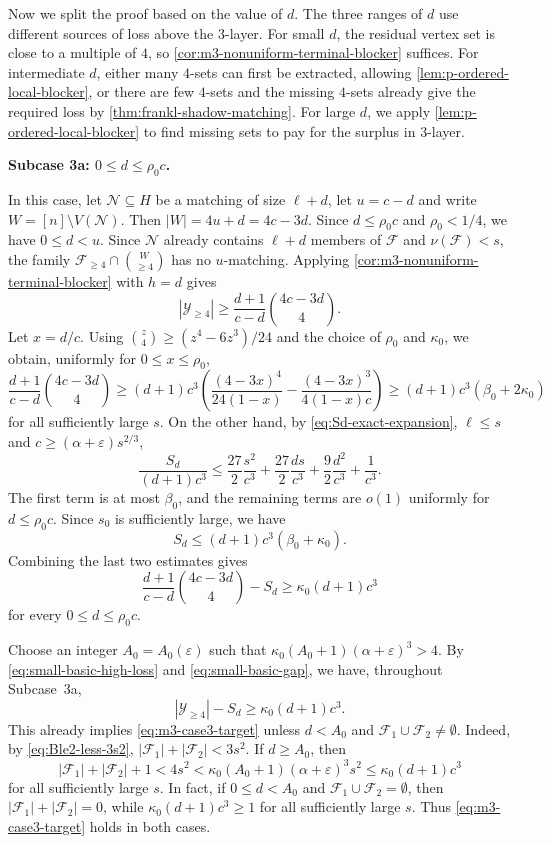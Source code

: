 \documentclass[10pt,a4paper]{article}
\numberwithin{equation}{section}
\theoremstyle{definition}
\newcommand{\F}{\mathcal F}
\newcommand{\Y}{\mathcal Y}
\begin{document}
Now we split the proof based on the value of $d$.
The three ranges of $d$ use different sources of loss above the $3$-layer.
For small $d$, the residual vertex set is close to a multiple of $4$, so \cref{cor:m3-nonuniform-terminal-blocker} suffices.
For intermediate $d$, either many $4$-sets can first be extracted,
allowing \cref{lem:p-ordered-local-blocker}, or there are few $4$-sets and the missing $4$-sets already give the required loss by \cref{thm:frankl-shadow-matching}.
For large $d$, we apply \cref{lem:p-ordered-local-blocker} to find missing sets to pay for the surplus in $3$-layer.

\medskip
\noindent\textbf{Subcase 3a: $0\le d\le\rho_0 c$.}
\medskip

In this case, let $\mathcal N\subseteq H$ be a matching of size $\ell+d$, let $u=c-d$ and write $W=[n]\setminus V(\mathcal N)$.
Then $|W|=4u+d=4c-3d$.
Since $d\le \rho_0 c$ and $\rho_0<1/4$, we have $0\le d<u$.
Since $\mathcal N$ already contains $\ell+d$ members of $\F$ and $\nu(\mathcal F)<s$, the family $\F_{\ge4}\cap\binom W{\ge4}$ has no $u$-matching.
Applying \cref{cor:m3-nonuniform-terminal-blocker} with $h=d$ gives
\begin{equation}\label{eq:small-basic-high-loss}
        |\Y_{\ge4}|
        \ge
        \frac{d+1}{c-d}\binom{4c-3d}{4}.
\end{equation}
Let $x=d/c$.
Using $\binom z4\ge (z^4-6z^3)/24$ and the choice of $\rho_0$ and $\kappa_0$, we obtain, uniformly for $0\le x\le\rho_0$,
\[
        \frac{d+1}{c-d}\binom{4c-3d}{4}
        \ge
        (d+1)c^3
        \left(
        \frac{(4-3x)^4}{24(1-x)}
        -\frac{(4-3x)^3}{4(1-x)c}
        \right)
        \ge (d+1)c^3(\beta_0+2\kappa_0)
\]
for all sufficiently large $s$.
On the other hand, by \eqref{eq:Sd-exact-expansion}, $\ell\le s$ and $c\ge(\alpha+\varepsilon)s^{2/3}$,
\[
        \frac{S_d}{(d+1)c^3}
        \le
        \frac{27}{2}\frac{s^2}{c^3}
        +\frac{27}{2}\frac{ds}{c^3}
        +\frac{9}{2}\frac{d^2}{c^3}
        +\frac1{c^3}.
\]
The first term is at most $\beta_0$, and the remaining terms are $o(1)$ uniformly for $d\le\rho_0 c$.
Since $s_0$ is sufficiently large, we have
\[
        S_d\le (d+1)c^3(\beta_0+\kappa_0).
\]
Combining the last two estimates gives
\begin{equation}\label{eq:small-basic-gap}
        \frac{d+1}{c-d}\binom{4c-3d}{4}-S_d
        \ge
        \kappa_0(d+1)c^3
\end{equation}
for every $0\le d\le\rho_0 c$.

Choose an integer $A_0=A_0(\varepsilon)$ such that $\kappa_0(A_0+1)(\alpha+\varepsilon)^3>4$.
By \eqref{eq:small-basic-high-loss} and \eqref{eq:small-basic-gap}, we have, throughout Subcase~3a,
\[
        |\Y_{\ge4}|-S_d \ge \kappa_0(d+1)c^3.
\]
This already implies \eqref{eq:m3-case3-target} unless $d<A_0$ and $\F_1\cup\F_2\ne\emptyset$.
Indeed, by \eqref{eq:Ble2-less-3s2}, $|\F_1|+|\F_2|<3s^2$.
If $d\ge A_0$, then
\[
        |\F_1|+|\F_2|+1<4s^2<\kappa_0(A_0+1)(\alpha+\varepsilon)^3s^2\le \kappa_0(d+1)c^3
\]
for all sufficiently large $s$.
In fact, if $0\le d<A_0$ and $\F_1\cup\F_2=\emptyset$, then $|\F_1|+|\F_2|=0$, while $\kappa_0(d+1)c^3\ge1$ for all sufficiently large $s$.
Thus \eqref{eq:m3-case3-target} holds in both cases.
\end{document}
